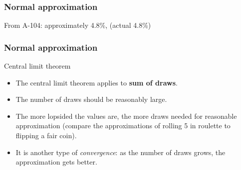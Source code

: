 \documentclass[handout]{beamer}
\begin{document}


   \begin{frame}
   \frametitle{Normal approximation}
   \begin{center}
   \end{center}
   From A-104: approximately 4.8\%, (actual 4.8\%)
   \end{frame}


   \begin{frame} \frametitle{Normal approximation}

   \begin{block}
   {Central limit theorem}
   \begin{itemize}
   \item The central limit theorem applies to {\bf sum of draws}.
   \item The number of draws should be reasonably large.
   \item The more lopsided the values are, the more draws needed for
   reasonable approximation (compare the approximations of rolling {\color{red} 5} in roulette
   to flipping a fair coin).
   \item It is another type of {\em convergence}: as the number
   of draws grows, the approximation gets better.
   \end{itemize}
   \end{block}
   \end{frame}

\end{document}
